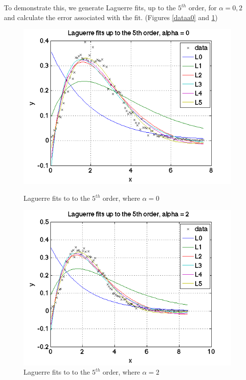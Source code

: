 \documentclass{article}
\begin{document}
To demonstrate this, we generate Laguerre fits, up to the $5^{th}$ order, for $\alpha = 0, 2$ and calculate the error associated with the fit. (Figures \ref{dataa0} and \ref{dataa2})


\begin{figure}[h]
\centering
	\begin{minipage}[c][][b]{0.45\linewidth}
		\begin{center}
		\includegraphics[scale=0.35]{Matlab/FittingData/Graph/fitdataa0.png}  
		\end{center}
		\caption[b]{Laguerre fits to to the $5^{th}$ order, where $\alpha = 0$}
		\label{dataa0}
	\end{minipage}
\quad\quad\quad\quad
	\begin{minipage}[c][][b]{0.45\linewidth}
		\begin{center}
		\includegraphics[scale=0.35]{Matlab/FittingData/Graph/fitdataa2.png}
		\end{center}
		\caption[b]{Laguerre fits to to the $5^{th}$ order, where $\alpha = 2$}
		\label{dataa2}
	\end{minipage}
\end{figure}
\end{document}
